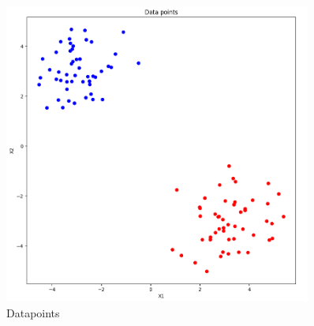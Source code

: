\documentclass[12pt,a4paper]{article}
\begin{document}
\begin{figure}[H]
	\centering
  \includegraphics[width=0.9\textwidth]{figures/datapoints1.png}
	\caption{Datapoints}
	\label{datapoints1}
\end{figure}
\end{document}
